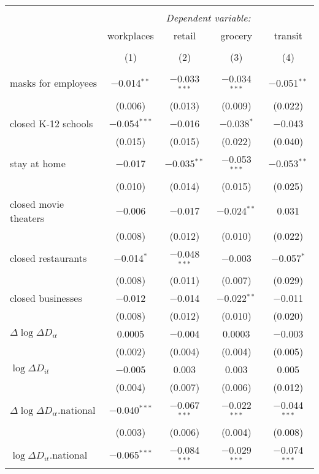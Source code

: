 \begin{tabular}{@{\extracolsep{1pt}}lcccc} 
\\[-1.8ex]\hline 
\hline \\[-1.8ex] 
 & \multicolumn{4}{c}{\textit{Dependent variable:}} \\ 
\cline{2-5} 
 & workplaces & retail & grocery & transit \\ 
\\[-1.8ex] & (1) & (2) & (3) & (4)\\ 
\hline \\[-1.8ex] 
 masks for employees & $-$0.014$^{**}$ & $-$0.033$^{***}$ & $-$0.034$^{***}$ & $-$0.051$^{**}$ \\ 
  & (0.006) & (0.013) & (0.009) & (0.022) \\ 
  closed K-12 schools & $-$0.054$^{***}$ & $-$0.016 & $-$0.038$^{*}$ & $-$0.043 \\ 
  & (0.015) & (0.015) & (0.022) & (0.040) \\ 
  stay at home & $-$0.017 & $-$0.035$^{**}$ & $-$0.053$^{***}$ & $-$0.053$^{**}$ \\ 
  & (0.010) & (0.014) & (0.015) & (0.025) \\ 
  closed movie theaters & $-$0.006 & $-$0.017 & $-$0.024$^{**}$ & 0.031 \\ 
  & (0.008) & (0.012) & (0.010) & (0.022) \\ 
  closed restaurants & $-$0.014$^{*}$ & $-$0.048$^{***}$ & $-$0.003 & $-$0.057$^{*}$ \\ 
  & (0.008) & (0.011) & (0.007) & (0.029) \\ 
  closed businesses & $-$0.012 & $-$0.014 & $-$0.022$^{**}$ & $-$0.011 \\ 
  & (0.008) & (0.012) & (0.010) & (0.020) \\ 
  $\Delta \log \Delta D_{it}$ & 0.0005 & $-$0.004 & 0.0003 & $-$0.003 \\ 
  & (0.002) & (0.004) & (0.004) & (0.005) \\ 
  $\log \Delta D_{it}$ & $-$0.005 & 0.003 & 0.003 & 0.005 \\ 
  & (0.004) & (0.007) & (0.006) & (0.012) \\ 
  $\Delta \log \Delta D_{it}$.national & $-$0.040$^{***}$ & $-$0.067$^{***}$ & $-$0.022$^{***}$ & $-$0.044$^{***}$ \\ 
  & (0.003) & (0.006) & (0.004) & (0.008) \\ 
  $\log \Delta D_{it}$.national & $-$0.065$^{***}$ & $-$0.084$^{***}$ & $-$0.029$^{***}$ & $-$0.074$^{***}$ \\ 

\end{tabular}
